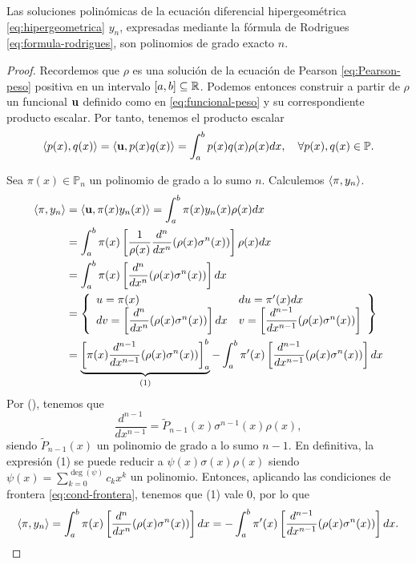 \begin{proposicion}
    \label{prop:grado-rodrigues}
    Las soluciones polinómicas de la ecuación diferencial hipergeométrica \eqref{eq:hipergeometrica} $y_n$, expresadas mediante la fórmula de Rodrigues \eqref{eq:formula-rodrigues}, son polinomios de grado exacto $n$.
\end{proposicion}
\begin{proof}
    Recordemos que $\rho$ es una solución de la ecuación de Pearson \eqref{eq:Pearson-peso} positiva en un intervalo $[a,b]\subseteq \mathbb{R}$. Podemos entonces construir a partir de $\rho$ un funcional $\mathbf{u}$ definido como en \eqref{eq:funcional-peso} y su correspondiente producto escalar. Por tanto, tenemos el producto escalar
    $$
    \left\langle p(x) , q(x) \right\rangle = \left\langle \mathbf{u} , p(x)q(x) \right\rangle = \int_a^b p(x)q(x)\rho(x)dx, \ \ \ \forall p(x),q(x)\in\mathbb{P}. 
    $$

    Sea $\pi(x)\in\mathbb{P}_n$ un polinomio de grado a lo sumo $n$. Calculemos $\left\langle \pi , y_n \right\rangle$.
    \begin{equation*}
        \begin{split}
            \left\langle \pi , y_n \right\rangle &= \left\langle \mathbf{u} , \pi(x)y_n(x) \right\rangle = \int_a^b \pi(x)y_n(x)\rho(x)dx \\
            &= \int_a^b \pi(x)\left[\dfrac 1 {\rho(x)} \dfrac{d^n}{dx^n} (\rho(x) \sigma^n(x))\right]\rho(x)dx \\
            &= \int_a^b \pi(x)\left[\dfrac{d^n}{dx^n} (\rho(x) \sigma^n(x))\right]dx \\
            &= \left\{\begin{array}{ll}
                u=\pi(x) & du = \pi'(x)dx\\
                dv =  \left[\dfrac{d^n}{dx^n} (\rho(x) \sigma^n(x))\right]dx  & v=\left[\dfrac{d^{n-1}}{dx^{n-1}} (\rho(x) \sigma^n(x))\right]
             \end{array}\right\} \\
            &= \underbrace{\left[\pi(x)\dfrac{d^{n-1}}{dx^{n-1}} (\rho(x) \sigma^n(x))\right]_a^b}_{(1)} - \int_a^b \pi'(x)\left[\dfrac{d^{n-1}}{dx^{n-1}} (\rho(x) \sigma^n(x))\right]dx \\
        \end{split}
    \end{equation*}
    Por (), tenemos que
    $$
    \dfrac{d^{n-1}}{dx^{n-1}} = \tilde P_{n-1}(x) \sigma^{n-1}(x)\rho(x),
    $$
    siendo $\tilde P_{n-1}(x)$ un polinomio de grado a lo sumo $n-1$. En definitiva, la expresión (1) se puede reducir a $\psi(x)\sigma(x)\rho(x)$ siendo $\psi(x)=\displaystyle\sum_{k=0}^{\deg(\psi)}c_k x^k$ un polinomio. Entonces, aplicando las condiciones de frontera \eqref{eq:cond-frontera}, tenemos que (1) vale $0$, por lo que
    $$
    \left\langle \pi , y_n \right\rangle = \int_a^b \pi(x)\left[\dfrac{d^n}{dx^n} (\rho(x) \sigma^n(x))\right]dx = - \int_a^b \pi'(x)\left[\dfrac{d^{n-1}}{dx^{n-1}} (\rho(x) \sigma^n(x))\right]dx.
    $$


\end{proof}
